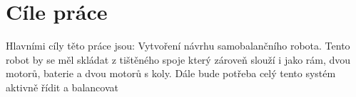 \chapter*{Cíle práce}
%

Hlavními cíly těto práce jsou: Vytvoření návrhu samobalančního robota. Tento robot by se měl skládat z tištěného spoje který zároveň slouží i jako rám, dvou motorů, baterie a dvou motorů s koly.
Dále bude potřeba celý tento systém aktivně řídit a balancovat